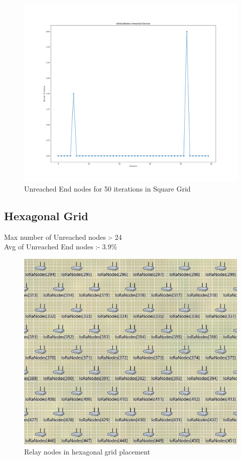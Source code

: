 \begin{figure}[ht!]
    \centering
    \includegraphics[scale=0.25]{images/unreached end nodes square.png}
    \caption{Unreached End nodes for 50 iterations in Square Grid }
    \label{fig:unreached in square}
\end{figure}


\newpage
\subsection{Hexagonal Grid}

Max number of Unreached nodes :- 24\\
Avg of Unreached End nodes :- 3.9$\%$

\begin{figure}[ht!]
    \centering
    \includegraphics[scale=0.35]{images/hexa_grid.png}
    \caption{Relay nodes in hexagonal grid placement}
\end{figure}


